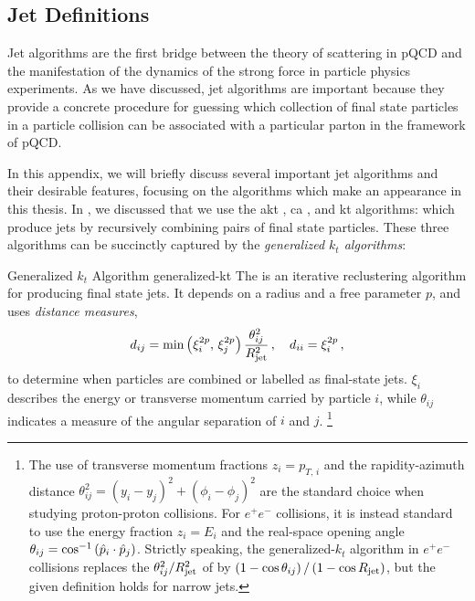 \begin{subappendices}

\section{Jet Definitions}

Jet algorithms are the first bridge between the theory of scattering in pQCD and the manifestation of the dynamics of the strong force in particle physics experiments.
%
As we have discussed, jet algorithms are important because they provide a concrete procedure for guessing which collection of final state particles in a particle collision can be associated with a particular parton in the framework of pQCD.

In this appendix, we will briefly discuss several important jet algorithms and their desirable features, focusing on the algorithms which make an appearance in this thesis.
%
In , we discussed that we use the \gls{akt} \cite{}, \gls{ca} \cite{}, and \gls{kt} \cite{} algorithms:
%
 which produce jets by recursively combining pairs of final state particles.
%
These three algorithms can be succinctly captured by the \textit{generalized \(k_t\) algorithms}:
%
\cite{}

\begin{definitionbox}
        {Generalized \(k_t\) Algorithm}
        {generalized-kt}
    The  is an iterative \gls{reclustering} algorithm for producing final state jets.
    It depends on a radius \Rjet{} and a free parameter \(p\), and uses \emph{distance measures},
    \begin{align}
        \label{eq:gen-kt-measure}
        d_{ij}
        =
        \min\le(\xi_i^{2p},\, \xi_j^{2p}\ri)
        \frac{\theta_{ij}^2}{\Rjet^2}
        \,,
        \quad
        d_{ii}
        =
        \xi_i^{2p}
        \,,
    \end{align}
    to determine when particles are combined or labelled as final-state jets.
    \(\xi_i\) describes the energy or transverse momentum carried by particle \(i\), while \(\theta_{ij}\) indicates a measure of the angular separation of \(i\) and \(j\).%
    \footnote{
        The use of transverse momentum fractions \(z_i = p_{T,\,i}\) and the rapidity-azimuth distance \(\theta_{ij}^2 = (y_i-y_j)^2 + (\phi_i-\phi_j)^2\) are the standard choice when studying proton-proton collisions.
        For \(e^+ e^-\) collisions, it is instead standard to use the energy fraction \(z_i = E_i\) and the real-space opening angle \(\theta_{ij} = \cos^{-1}\left(\hat{p}_i \cdot \hat{p}_j\right)\).
        Strictly speaking, the generalized-\(k_t\) algorithm in \(e^+ e^-\) collisions replaces the \(\theta_{ij}^2/R_\text{jet}^2\) of  by \(\left(1-\cos\theta_{ij}\right)/\left(1-\cos R_\text{jet}\right)\), but the given definition holds for narrow jets.
    }


\end{definitionbox}
\end{subappendices}

